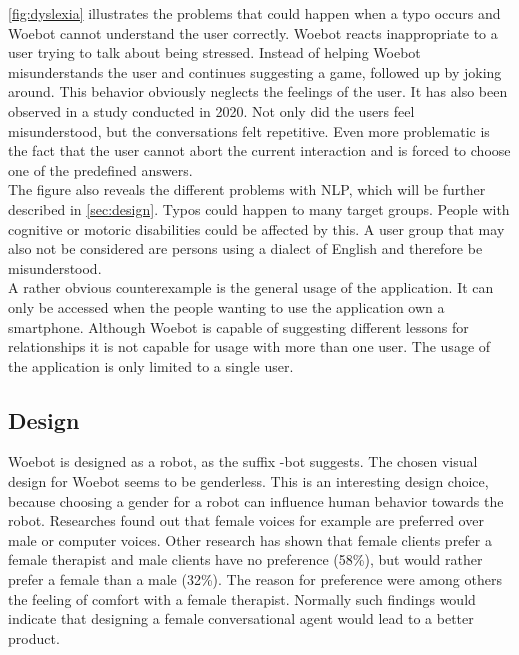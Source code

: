 \autoref{fig:dyslexia} illustrates the problems that could happen when a typo occurs and Woebot cannot understand the user correctly.
Woebot reacts inappropriate to a user trying to talk about being stressed.
Instead of helping Woebot misunderstands the user and continues suggesting a game, followed up by joking around.
This behavior obviously neglects the feelings of the user.
It has also been observed in a study conducted in 2020\cite{investigating-students}.
Not only did the users feel misunderstood, but the conversations felt repetitive.
Even more problematic is the fact that the user cannot abort the current interaction and is forced to choose one of the predefined answers.\\

The figure also reveals the different problems with NLP, which will be further described in \autoref{sec:design}.
Typos could happen to many target groups.
People with cognitive or motoric disabilities could be affected by this.
A user group that may also not be considered are persons using a dialect of English and therefore be misunderstood.\\

A rather obvious counterexample is the general usage of the application.
It can only be accessed when the people wanting to use the application own a smartphone.
Although Woebot is capable of suggesting different lessons for relationships it is not capable for usage with more than one user.
The usage of the application is only limited to a single user.\\



\subsection{Design}\label{sec:design}
Woebot is designed as a robot, as the suffix -bot suggests.
The chosen visual design for Woebot seems to be genderless.
This is an interesting design choice, because choosing a gender for a robot can influence human behavior towards the robot.
Researches found out that female voices for example are preferred over male or computer voices\cite{bias-robot}.
Other research has shown that female clients prefer a female therapist and male clients have no preference (58\%), but would rather prefer a female than a male (32\%)\cite{client-gender-preference}.
The reason for preference were among others the feeling of comfort with a female therapist.
Normally such findings would indicate that designing a female conversational agent would lead to a better product.\\


